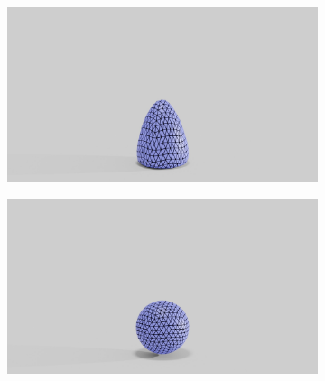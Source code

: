 \begin{figure}
\begin{subfigure}{.16\linewidth}
		\label{sfig:ball-045-5}
	\end{subfigure}%
	\begin{subfigure}{.16\linewidth}
		\centering
		{\includegraphics[width=2.0\textwidth]{images/coarse_ball/045/0450.jpg}}
		\label{sfig:ball-045-6}
	\end{subfigure}\hfill
	\begin{subfigure}{.03\linewidth}
	\end{subfigure}%
	\begin{subfigure}{.16\linewidth}
		\centering
		{\includegraphics[width=2.0\textwidth]{images/coarse_ball/0495/0200.jpg}}
		\label{sfig:ball-0495-1}
	\end{subfigure}%
	\begin{subfigure}{.16\linewidth}
		\centering

\end{subfigure}
\end{figure}
